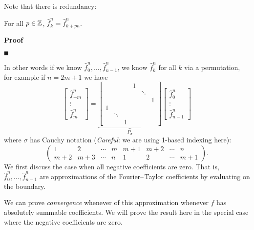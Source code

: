 Note that there is redundancy:

\begin{corollary}[aliasing] For all $p \in {\mathbb Z}$, $\hat f_k^n = \hat f_{k+pn}^n$.

\end{corollary}
\textbf{Proof}

\ensuremath{\QED}

In other words if we know $\hat f_0^n, \ensuremath{\ldots}, \hat f_{n-1}^n$, we know $\hat f_k^n$ for all $k$ via a permutation, for example if $n = 2m+1$ we have
\[
\begin{bmatrix}
\hat f_{-m}^n \\
\ensuremath{\vdots}\\
\hat f_m^n
\end{bmatrix} = \underbrace{\begin{bmatrix} &&& 1 \\ &&&& \ensuremath{\ddots} \\ &&&&& 1 \\
    1 \\ & \ensuremath{\ddots} \\ && 1 \end{bmatrix}}_{P_\ensuremath{\sigma}}
\begin{bmatrix}
\hat f_0^n \\
\ensuremath{\vdots}\\
\hat f_{n-1}^n
\end{bmatrix}
\]
where $\ensuremath{\sigma}$ has Cauchy notation (\emph{Careful}: we are using 1-based indexing here):
\[
\begin{pmatrix}
1 & 2 & \ensuremath{\cdots} & m & m+1 & m+2 & \ensuremath{\cdots} & n  \\
m+2 & m+3 & \ensuremath{\cdots} & n & 1 & 2 & \ensuremath{\cdots} & m+1
\end{pmatrix}.
\]
We first discuss the case when all negative coefficients are zero. That is, $\hat f_0^n, \ensuremath{\ldots}, \hat f_{n-1}^n$ are approximations of the Fourier\ensuremath{\endash}Taylor coefficients by evaluating on the boundary.

We can  prove \emph{convergence} whenever of this approximation whenever $f$ has absolutely summable coefficients. We will prove the result here in the special case where the negative coefficients are zero.


